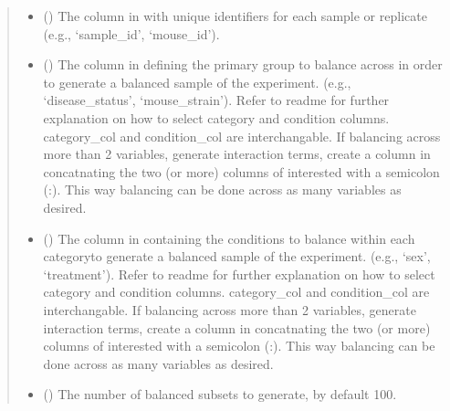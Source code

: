 \documentclass[letterpaper,10pt,english]{sphinxmanual}
\begin{document}
\begin{fulllineitems}
\begin{quote}
\begin{description}
\begin{itemize}
\item {} 
\sphinxAtStartPar
{} (\sphinxstyleliteralemphasis{\sphinxupquote{, }}) \textendash{} The column in  with unique identifiers for each sample or replicate
(e.g., ‘sample\_id’, ‘mouse\_id’).

\item {} 
\sphinxAtStartPar
{} (\sphinxstyleliteralemphasis{\sphinxupquote{, }}) \textendash{} The column in  defining the primary group to balance across in order
to generate a balanced sample of the experiment. (e.g., ‘disease\_status’, ‘mouse\_strain’).
Refer to readme for further explanation on how to select category and condition columns.
category\_col and condition\_col are interchangable.
If balancing across more than 2 variables, generate interaction terms, create a column
in  concatnating the two (or more) columns of interested with a semicolon (:).
This way balancing can be done across as many variables as desired.

\item {} 
\sphinxAtStartPar
{} (\sphinxstyleliteralemphasis{\sphinxupquote{, }}) \textendash{} The column in  containing the conditions to balance within
each categoryto generate a balanced sample of the experiment.  (e.g., ‘sex’, ‘treatment’).
Refer to readme for further explanation on how to select category and condition columns.
category\_col and condition\_col are interchangable.
If balancing across more than 2 variables, generate interaction terms, create a column
in  concatnating the two (or more) columns of interested with a semicolon (:).
This way balancing can be done across as many variables as desired.

\item {} 
\sphinxAtStartPar
{} (\sphinxstyleliteralemphasis{\sphinxupquote{, }}) \textendash{} The number of balanced subsets to generate, by default 100.


\end{itemize}
\end{description}
\end{quote}
\end{fulllineitems}
\end{document}
